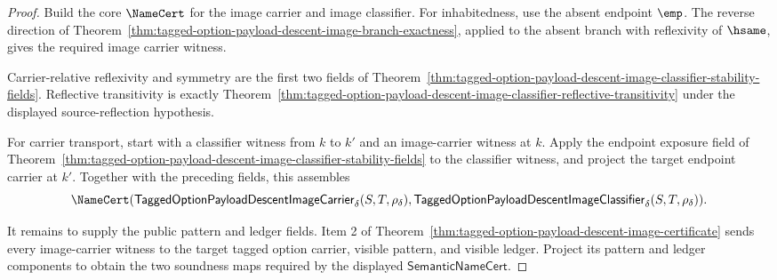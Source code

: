 \begin{proof}
Build the core $\NameCert$ for the image carrier and image classifier. For
inhabitedness, use the absent endpoint $\emp$. The reverse direction of
Theorem~\ref{thm:tagged-option-payload-descent-image-branch-exactness}, applied
to the absent branch with reflexivity of $\hsame$, gives the required image
carrier witness.

Carrier-relative reflexivity and symmetry are the first two fields of
Theorem~\ref{thm:tagged-option-payload-descent-image-classifier-stability-fields}.
Reflective transitivity is exactly
Theorem~\ref{thm:tagged-option-payload-descent-image-classifier-reflective-transitivity}
under the displayed source-reflection hypothesis.

For carrier transport, start with a classifier witness from $k$ to $k'$ and an
image-carrier witness at $k$. Apply the endpoint exposure field of
Theorem~\ref{thm:tagged-option-payload-descent-image-classifier-stability-fields}
to the classifier witness, and project the target endpoint carrier at $k'$.
Together with the preceding fields, this assembles
$$
\NameCert(\mathsf{TaggedOptionPayloadDescentImageCarrier}_{\delta}
(S,T,\rho_{\delta}),
\mathsf{TaggedOptionPayloadDescentImageClassifier}_{\delta}
(S,T,\rho_{\delta})).
$$

It remains to supply the public pattern and ledger fields. Item 2 of
Theorem~\ref{thm:tagged-option-payload-descent-image-certificate} sends every
image-carrier witness to the target tagged option carrier, visible pattern, and
visible ledger. Project its pattern and ledger components to obtain the two
soundness maps required by the displayed $\mathsf{SemanticNameCert}$.
\end{proof}
